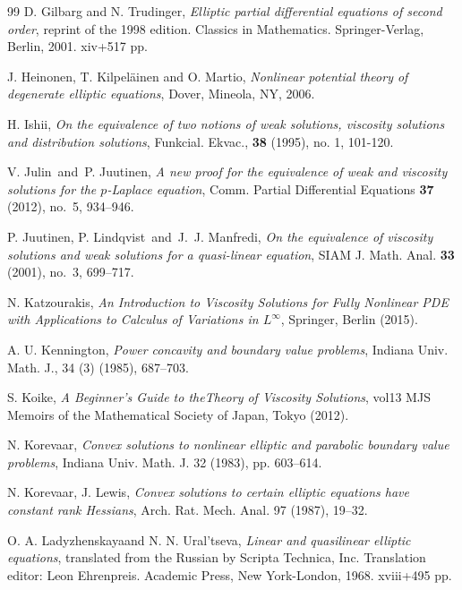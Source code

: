 \documentclass[12pt]{amsart}
\newcommand{\1}{\mathbf 1}
\begin{document}
\begin{thebibliography}{99}
 D. Gilbarg and N. Trudinger, {\em Elliptic partial differential equations of second order}, reprint of the 1998 edition. Classics in Mathematics. Springer-Verlag, Berlin, 2001. xiv+517 pp.


J. Heinonen, T. Kilpel\"ainen and O. Martio, {\it Nonlinear potential theory of degenerate elliptic equations}, Dover, Mineola, NY, 2006.

 H. Ishii, {\em On the equivalence of two notions of weak solutions, viscosity solutions and distribution solutions}, Funkcial. Ekvac., {\bf 38} (1995), no. 1, 101-120.

 V. Julin\ and\ P. Juutinen, {\em A new proof for the equivalence of weak and viscosity solutions for the $p$-Laplace equation}, Comm. Partial Differential Equations {\bf 37} (2012), no.~5, 934--946.

P. Juutinen, P. Lindqvist\ and\ J.~J. Manfredi, {\em On the equivalence of viscosity solutions and weak solutions for a quasi-linear equation}, SIAM J. Math. Anal. {\bf 33} (2001), no.~3, 699--717.

 N. Katzourakis, {\em An Introduction to Viscosity Solutions for Fully Nonlinear PDE with Applications to Calculus of Variations in $L^\infty$}, Springer, Berlin (2015).

 A. U. Kennington, {\it Power concavity and boundary value problems}, Indiana Univ. Math. J., 34 (3) (1985), 687--703.

 S. Koike, {\em A Beginner's Guide to theTheory of Viscosity Solutions}, vol13 MJS Memoirs of the Mathematical Society of Japan, Tokyo (2012).

 N. Korevaar, {\it Convex solutions to nonlinear elliptic and parabolic boundary value problems}, Indiana Univ. Math. J. 32 (1983), pp. 603--614.

 N. Korevaar, J. Lewis, {\it Convex solutions to certain elliptic equations have constant rank Hessians}, Arch. Rat. Mech. Anal. 97 (1987), 19--32.

 O. A. Ladyzhenskayaand N. N. Ural'tseva,
{\em Linear and quasilinear elliptic equations}, translated from the Russian by Scripta Technica, Inc. Translation editor: Leon Ehrenpreis. Academic Press, New York-London, 1968. xviii+495 pp.


\end{thebibliography}
\end{document}
